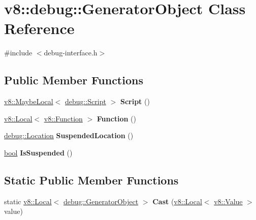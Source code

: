 \hypertarget{classv8_1_1debug_1_1GeneratorObject}{}\section{v8\+:\+:debug\+:\+:Generator\+Object Class Reference}
\label{classv8_1_1debug_1_1GeneratorObject}


{\ttfamily \#include $<$debug-\/interface.\+h$>$}

\subsection*{Public Member Functions}
\begin{DoxyCompactItemize}
\item 
\mbox{\label{classv8_1_1debug_1_1GeneratorObject_a5affffda42376a5ad5927ad754d30410}} 
\mbox{\hyperlink{classv8_1_1MaybeLocal}{v8\+::\+Maybe\+Local}}$<$ \mbox{\hyperlink{classv8_1_1debug_1_1Script}{debug\+::\+Script}} $>$ {\bfseries Script} ()
\item 
\mbox{\label{classv8_1_1debug_1_1GeneratorObject_aae19008f6b15d605e3a95814fd9aa637}} 
\mbox{\hyperlink{classv8_1_1Local}{v8\+::\+Local}}$<$ \mbox{\hyperlink{classv8_1_1Function}{v8\+::\+Function}} $>$ {\bfseries Function} ()
\item 
\mbox{\label{classv8_1_1debug_1_1GeneratorObject_ac0f739e690192116469c1aff6ec5d34f}} 
\mbox{\hyperlink{classv8_1_1debug_1_1Location}{debug\+::\+Location}} {\bfseries Suspended\+Location} ()
\item 
\mbox{\label{classv8_1_1debug_1_1GeneratorObject_ad2fcad0fcfa75fae66a773f4f3514004}} 
\mbox{\hyperlink{classbool}{bool}} {\bfseries Is\+Suspended} ()
\end{DoxyCompactItemize}
\subsection*{Static Public Member Functions}
\begin{DoxyCompactItemize}
\item 
\mbox{\label{classv8_1_1debug_1_1GeneratorObject_a33c8ffd267a95f0b8a90b0c5333c5a8d}} 
static \mbox{\hyperlink{classv8_1_1Local}{v8\+::\+Local}}$<$ \mbox{\hyperlink{classv8_1_1debug_1_1GeneratorObject}{debug\+::\+Generator\+Object}} $>$ {\bfseries Cast} (\mbox{\hyperlink{classv8_1_1Local}{v8\+::\+Local}}$<$ \mbox{\hyperlink{classv8_1_1Value}{v8\+::\+Value}} $>$ value)
\end{DoxyCompactItemize}


